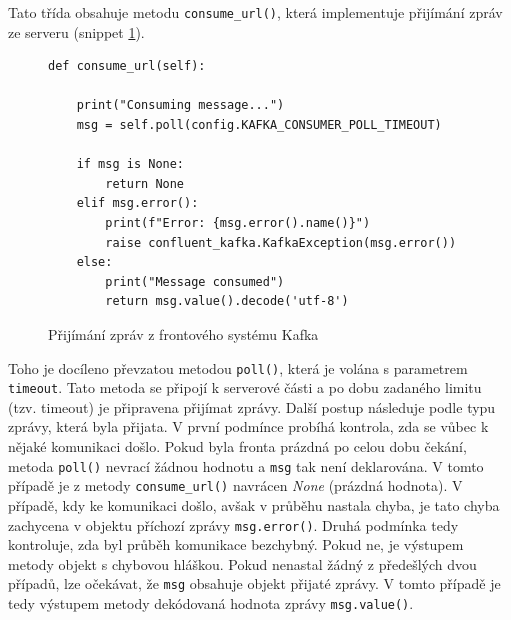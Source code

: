 \documentclass[thesis=M,czech,hidelinks]{FITthesis}[2013/05/06]
\begin{document}
Tato třída obsahuje metodu \texttt{consume_url()}, která implementuje přijímání zpráv ze serveru (snippet \ref{snip:kafkapoll}).
\begin{figure}[h]               
	\begin{verbatim}
def consume_url(self):
	
    print("Consuming message...")
    msg = self.poll(config.KAFKA_CONSUMER_POLL_TIMEOUT)
	
    if msg is None:
        return None
    elif msg.error():
        print(f"Error: {msg.error().name()}")
        raise confluent_kafka.KafkaException(msg.error())
    else:
        print("Message consumed")
        return msg.value().decode('utf-8')
	\end{verbatim}      
	\caption{Přijímání zpráv z frontového systému Kafka}
	\label{snip:kafkapoll}
\end{figure}
Toho je docíleno převzatou metodou \texttt{poll()}, která je volána s parametrem \texttt{timeout}. Tato metoda se připojí k serverové části a po dobu zadaného limitu (tzv. timeout) je připravena přijímat zprávy. Další postup následuje podle typu zprávy, která byla přijata. V první podmínce probíhá kontrola, zda se vůbec k nějaké komunikaci došlo. Pokud byla fronta prázdná po celou dobu čekání, metoda \texttt{poll()} nevrací žádnou hodnotu a \texttt{msg} tak není deklarována. V tomto případě je z metody \texttt{consume_url()} navrácen \textit{None} (prázdná hodnota). V případě, kdy ke komunikaci došlo, avšak v průběhu nastala chyba, je tato chyba zachycena v objektu příchozí zprávy \texttt{msg.error()}. Druhá podmínka tedy kontroluje, zda byl průběh komunikace bezchybný. Pokud ne, je výstupem metody objekt s chybovou hláškou. Pokud nenastal žádný z předešlých dvou případů, lze očekávat, že \texttt{msg} obsahuje objekt přijaté zprávy. V tomto případě je tedy výstupem metody dekódovaná hodnota zprávy \texttt{msg.value()}. 
\end{document}
